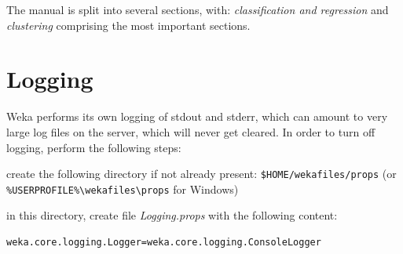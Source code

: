 \documentclass[a4paper]{book}
\begin{document}
The manual is split into several sections, with: \textit{classification and regression}
and \textit{clustering} comprising the most important sections.















\chapter{Logging}
Weka performs its own logging of stdout and stderr, which can amount to very
large log files on the server, which will never get cleared. In order to
turn off logging, perform the following steps:
\begin{tight_itemize}
  \item create the following directory if not already present: \verb|$HOME/wekafiles/props|
  (or \verb|%USERPROFILE%\wekafiles\props| for Windows)
  \item in this directory, create file \textit{Logging.props} with the following content:
  \begin{verbatim}
weka.core.logging.Logger=weka.core.logging.ConsoleLogger
  \end{verbatim}
\end{tight_itemize}


\end{document}
